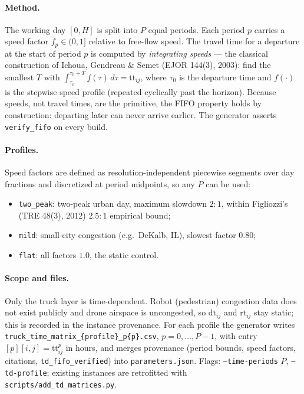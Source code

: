 \documentclass[10pt]{article}
\begin{document}
\paragraph{Method.} The working day $[0,H]$ is split into $P$ equal periods.
Each period $p$ carries a speed factor $f_p\in(0,1]$ relative to free-flow speed.
The travel time for a departure at the start of period $p$ is computed by
\emph{integrating speeds} --- the classical construction of Ichoua, Gendreau \&
Semet (EJOR 144(3), 2003): find the smallest $T$ with
$\int_{\tau_0}^{\tau_0+T} f(\tau)\,d\tau = \mathrm{tt}_{ij}$, where $\tau_0$ is
the departure time and $f(\cdot)$ is the stepwise speed profile (repeated
cyclically past the horizon). Because speeds, not travel times, are the
primitive, the FIFO property holds by construction: departing later can never
arrive earlier. The generator asserts \texttt{verify\_fifo} on every build.

\paragraph{Profiles.} Speed factors are defined as resolution-independent
piecewise segments over day fractions and discretized at period midpoints, so
any $P$ can be used:
\begin{itemize}
\item \texttt{two\_peak}: two-peak urban day, maximum slowdown $2{:}1$, within
Figliozzi's (TRE 48(3), 2012) $2.5{:}1$ empirical bound;
\item \texttt{mild}: small-city congestion (e.g.\ DeKalb, IL), slowest factor $0.80$;
\item \texttt{flat}: all factors $1.0$, the static control.
\end{itemize}

\paragraph{Scope and files.} Only the truck layer is time-dependent. Robot
(pedestrian) congestion data does not exist publicly and drone airspace is
uncongested, so $\mathrm{dt}_{ij}$ and $\mathrm{rt}_{ij}$ stay static; this is
recorded in the instance provenance. For each profile the generator writes
\texttt{truck\_time\_matrix\_\{profile\}\_p\{p\}.csv}, $p=0,\dots,P-1$, with entry
$[p][i,j]=\mathrm{tt}^p_{ij}$ in hours, and merges provenance (period bounds,
speed factors, citations, \texttt{td\_fifo\_verified}) into
\texttt{parameters.json}. Flags: \texttt{--time-periods} $P$,
\texttt{--td-profile}; existing instances are retrofitted with
\texttt{scripts/add\_td\_matrices.py}.
\end{document}
